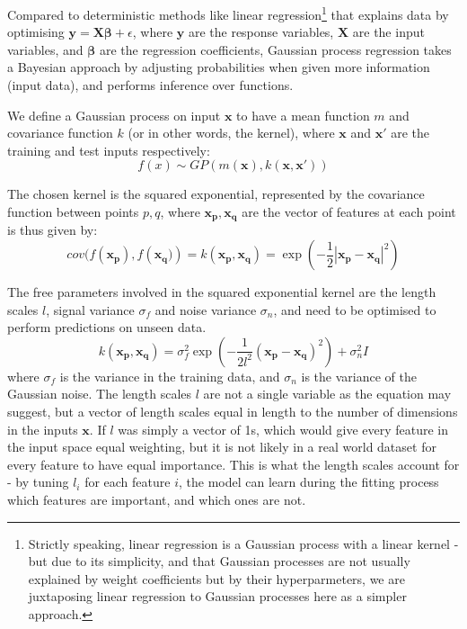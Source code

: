 Compared to deterministic methods like linear regression\footnote{Strictly speaking, linear regression is a Gaussian process with a linear kernel - but due to its simplicity, and that Gaussian processes are not usually explained by weight coefficients but by their hyperparmeters, we are juxtaposing linear regression to Gaussian processes here as a simpler approach.} that explains data by optimising $\mathbf{y=X\beta} + \epsilon$, where $\mathbf{y}$ are the response variables, $\mathbf{X}$ are the input variables, and $\mathbf{\beta}$ are the regression coefficients, Gaussian process regression takes a Bayesian approach by adjusting probabilities when given more information (input data), and performs inference over functions.

We define a Gaussian process on input $\mathbf{x}$ to have a mean function $m$ and covariance function $k$ (or in other words, the kernel), where $\mathbf{x}$ and $\mathbf{x'}$ are the training and test inputs respectively:
\begin{equation}
f(x) \sim GP(m(\mathbf{x}), k(\mathbf{x}, \mathbf{x'}))
\end{equation}

The chosen kernel is the squared exponential, represented by the covariance function between points $p, q$, where $\mathbf{x_p, x_q}$ are the vector of features at each point is thus given by:
\begin{equation}\label{eq:simplegpcov}
    cov(f(\mathbf{x_p}), f(\mathbf{x_q)}) = k(\mathbf{x_p, x_q}) = \exp(-\frac{1}{2}|\mathbf{x_p}-\mathbf{x_q}|^2)
\end{equation}

The free parameters involved in the squared exponential kernel are the length scales $l$, signal variance $\sigma_f$ and noise variance $\sigma_n$, and need to be optimised to perform predictions on unseen data.
\begin{equation}\label{eq:fullgpcov}
    k\mathbf{(x_p, x_q)} = \sigma^2_f \exp(-\frac{1}{2l^2} (\mathbf{x_p-x_q})^2) + \sigma^2_nI
\end{equation}
where $\sigma_f$ is the variance in the training data, and $\sigma_n$ is the variance of the Gaussian noise. The length scales $l$ are not a single variable as the equation may suggest, but a vector of length scales equal in length to the number of dimensions in the inputs $\mathbf{x}$. If $l$ was simply a vector of 1s, which would give every feature in the input space equal weighting, but it is not likely in a real world dataset for every feature to have equal importance. This is what the length scales account for - by tuning $l_i$ for each feature $i$, the model can learn during the fitting process which features are important, and which ones are not. 

